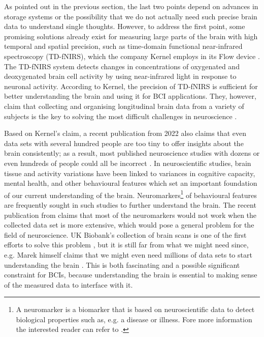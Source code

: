 As pointed out in the previous section, the last two points depend on advances in storage systems or the possibility that we do not actually need such precise brain data to understand single thoughts. However, to address the first point, some promising solutions already exist for measuring large parts of the brain with high temporal and spatial precision, such as time-domain functional near-infrared spectroscopy (TD-fNIRS), which the company Kernel employs in its Flow device \citep{ban_kernel_2021}. The TD-fNIRS system detects changes in concentrations of oxygenated and deoxygenated brain cell activity by using near-infrared light in response to neuronal activity. According to Kernel, the precision of TD-fNIRS is sufficient for better understanding the brain and using it for BCI applications. They, however, claim that collecting and organising longitudinal brain data from a variety of subjects is the key to solving the most difficult challenges in neuroscience \citep{kernel_hello-humanitypdf_nodate}.

\newpage

Based on Kernel's claim, a recent publication from 2022 also claims that even data sets with several hundred people are too tiny to offer insights about the brain consistently; as a result, most published neuroscience studies with dozens or even hundreds of people could all be incorrect \citep{marek_reproducible_2022}. In neuroscientific studies, brain tissue and activity variations have been linked to variances in cognitive capacity, mental health, and other behavioural features which set an important foundation of our current understanding of the brain. Neuromarkers\footnote{A neuromarker is a biomarker that is based on neuroscientific data to detect biological properties such as, e.g. a disease or illness. Fore more information the interested reader can refer to \cite{jollans_neuromarkers_2018}.} of behavioural features are frequently sought in such studies to further understand the brain. The recent publication from \citeauthor{marek_reproducible_2022} claims that most of the neuromarkers would not work when the collected data set is more extensive, which would pose a general problem for the field of neuroscience. UK Biobank's collection of brain scans is one of the first efforts to solve this problem \citep{noauthor_imaging_nodate}, but it is still far from what we might need since, e.g. Marek himself claims that we might even need millions of data sets to start understanding the brain \citep{callaway_can_2022}. This is both fascinating and a possible significant constraint for BCIs, because understanding the brain is essential to making sense of the measured data to interface with it.

